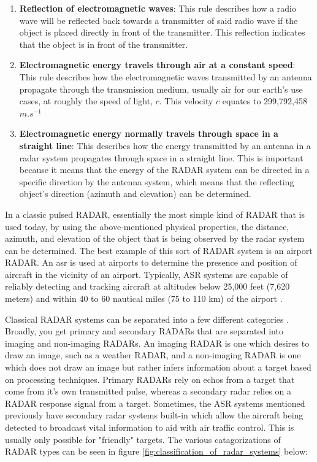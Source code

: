 \documentclass[11pt]{report}
\begin{document}
\begin{enumerate}
    \item \textbf{Reflection of electromagnetic waves}: This rule describes how a radio wave will be reflected back towards a transmitter of said radio wave if the object is placed directly in front of the transmitter. This reflection indicates that the object is in front of the transmitter.
    \item \textbf{Electromagnetic energy travels through air at a constant speed}: This rule describes how the electromagnetic waves transmitted by an antenna propagate through the transmission medium, usually air for our earth's use cases, at roughly the speed of light, $c$. This velocity $c$ equates to 299,792,458 $m.s^{-1}$ 
    \item \textbf{Electromagnetic energy normally travels through space in a straight line}: This describes how the energy transmitted by an antenna in a radar system propagates through space in a straight line. This is important because it means that the energy of the RADAR system can be directed in a specific direction by the antenna system, which means that the reflecting object's direction (azimuth and elevation) can be determined.
\end{enumerate}

In a classic pulsed RADAR, essentially the most simple kind of RADAR that is used today, by using the above-mentioned physical properties, the distance, azimuth, and elevation of the object that is being observed by the radar system can be determined. The best example of this sort of RADAR system is an airport RADAR. An \gls{asr} is used at airports to determine the presence and position of aircraft in the vicinity of an airport. Typically, ASR systems are capable of reliably detecting and tracking aircraft at altitudes below 25,000 feet (7,620 meters) and within 40 to 60 nautical miles (75 to 110 km) of the airport \cite{everythingrf_what_2022}.

Classical RADAR systems can be separated into a few different categories \cite{christian_wolff_classification_nodate}. Broadly, you get primary and secondary RADARs that are separated into imaging and non-imaging RADARs. An imaging RADAR is one which desires to draw an image, such as a weather RADAR, and a non-imaging RADAR is one which does not draw an image but rather infers information about a target based on processing techniques. Primary RADARs rely on echos from a target that come from it's own transmitted pulse, whereas a secondary radar relies on a RADAR response signal from a target. Sometimes, the ASR systems mentioned previously have secondary radar systems built-in which allow the aircraft being detected to broadcast vital information to aid with air traffic control. This is usually only possible for "friendly" targets. The various catagorizations of RADAR types can be seen in figure \ref{fig:classification_of_radar_systems} below:
\end{document}
